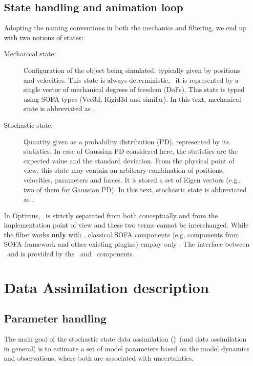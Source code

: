 \documentclass[10pt]{article}
\begin{document}
\subsection{State handling and animation loop}
Adopting the naming conventions in both the mechanics and filtering, we end up with two notions of states:
\begin{description}
	\item[Mechanical state:] Configuration of the object being simulated, typically given by positions and velocities. This state is always deterministic, \ie\, it is represented by a single vector of mechanical degrees of freedom (DoFs). This state is typed using SOFA types (Vec3d, Rigid3d and similar). 
	In this text, mechanical state is abbreviated as \mstate.
	\item[Stochastic state:] Quantity given as a probability distribution (PD), represented by its statistics. In case of Gaussian PD considered here, the statistics are the expected value and the standard deviation. From the physical point of view, this state may contain an arbitrary combination of positions, velocities, parameters and forces. It is stored a set of Eigen vectors (e.g., two of them for Gaussian PD). In this text, stochastic state is abbreviated as \sstate.
\end{description}
In Optimus, \mstate\ is strictly separated from \sstate both conceptually and from the implementation point of view and these two terms cannot be interchanged. While the filter works {\bf only} with \sstate, classical SOFA components (e.g. components from SOFA framework and other existing plugins) employ only \mstate. The interface between \sstate\ and \mstate is provided by the \ssw\ and \opr\ components.



\section{Data Assimilation description}


\subsection{Parameter handling}
The main goal of the stochastic state data assimilation (\ssda)\ (and data assimilation in general) is to estimate a set of model parameters based on the model dynamics and observations,
where both are associated with uncertainties.
\end{document}
